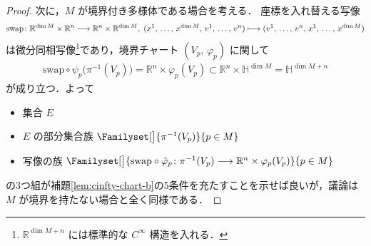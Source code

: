 \documentclass[TQFT_main]{subfiles}
\begin{document}
\begin{proof}
    次に，$M$ が境界付き多様体である場合を考える．
    座標を入れ替える写像
    \begin{align}
        \mathrm{swap} \colon \mathbb{R}^{\dim M} \times \mathbb{R}^n \longrightarrow \mathbb{R}^{n} \times \mathbb{R}^{\dim M},\; (x^1,\, \dots,\, x^{\dim M},\, v^1,\, \dots,\, v^n) \longmapsto (v^1,\, \dots,\, v^n,\, x^1,\, \dots,\, x^{\dim M})
    \end{align}
    は微分同相写像\footnote{$\mathbb{R}^{\dim M + n}$ には標準的な $C^\infty$ 構造を入れる．}であり，境界チャート $(V_p,\, \varphi_p)$ に関して
    \begin{align}
        \mathrm{swap} \circ \psi_p  \bigl( \pi^{-1}(V_p) \bigr) = \mathbb{R}^n \times \varphi_p (V_p) \subset \mathbb{R}^n \times \mathbb{H}^{\dim M} = \mathbb{H}^{\dim M + n}
    \end{align}
    が成り立つ．よって
    \begin{itemize}
        \item 集合 $E$
        \item $E$ の部分集合族 $\Familyset[\big]{\pi^{-1}(V_p)}{p \in M}$
        \item 写像の族 $\Familyset[\big]{\mathrm{swap} \circ \tilde{\varphi}_p \colon \pi^{-1}(V_p) \lto \mathbb{R}^n \times \varphi_p(V_p)}{p \in M}$
    \end{itemize}
    の3つ組が補題\ref{lem:cinfty-chart-b}の5条件を充たすことを示せば良いが，議論は $M$ が境界を持たない場合と全く同様である．
\end{proof}


    
\end{document}
